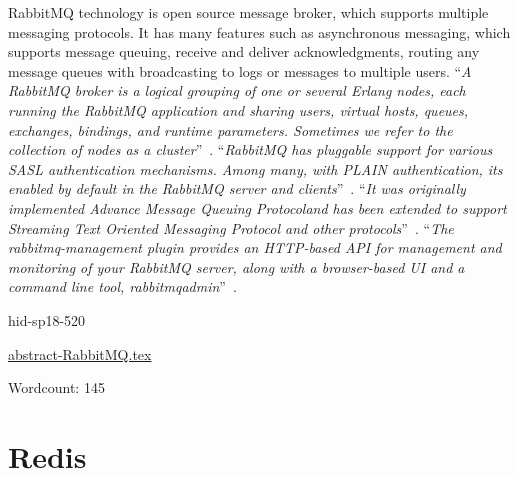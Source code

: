 RabbitMQ technology is open source message broker, which supports multiple 
messaging protocols. It has many features such as asynchronous messaging, 
which supports message queuing, receive and deliver acknowledgments, routing
any message queues with broadcasting to logs or messages to multiple users.
\color{blue}``\emph{A RabbitMQ broker is a logical grouping of one or
several Erlang nodes, each running the RabbitMQ application and sharing users,
virtual hosts, queues, exchanges, bindings, and runtime parameters. Sometimes 
we refer to the collection of nodes as a 
cluster}''\color{black}~\cite{hid-sp18-520-RabbitMQCluster}.
\color{blue}``\emph{RabbitMQ has pluggable support for various SASL authentication mechanisms. 
Among many, with PLAIN authentication, its enabled by default in the RabbitMQ 
server and clients}''\color{black}~\cite{hid-sp18-520-RabbitMQauth}.
\color{blue}``\emph{It was originally implemented Advance Message Queuing Protocoland has been 
extended to support Streaming Text Oriented Messaging Protocol and other 
protocols}''\color{black}~\cite{hid-sp18-520-RabbitMQ-wiki}.
\color{blue}``\emph{The rabbitmq-management plugin provides an HTTP-based API for management and 
monitoring of your RabbitMQ server, along with a browser-based UI and a 
command line tool, rabbitmqadmin}''\color{black}~\cite{hid-sp18-520-RabbitMQ-mana}.


\begin{IU}

hid-sp18-520

\href{https://github.com/cloudmesh-community/hid-sp18-520/blob/master//technology/abstract-RabbitMQ.tex}{abstract-RabbitMQ.tex}

 

Wordcount: 145

\end{IU}

\section{Redis}

